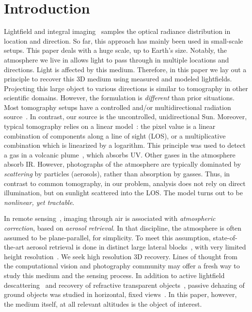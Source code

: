 \documentclass[10pt,twocolumn,letterpaper]{article}
\begin{document}
\section{Introduction}

Lightfield and integral imaging~\cite{bishop,horstmeyer,levoy,kim}  samples the optical radiance distribution in location and direction. So far, this approach has mainly been used in small-scale setups. This paper deals with a huge scale, up to Earth's size.
Notably, the atmosphere we live in allows light to pass through in multiple locations and directions. Light is affected by this medium. Therefore, in this paper we lay out a principle to recover this 3D medium using measured and modeled lightfields. Projecting this large object to various directions is similar to tomography in other scientific domains. However, the formulation is {\em different} than prior situations. Most tomography setups have a controlled and/or multidirectional radiation source~\cite{gorbunov,messer}. In contrast, our source is the uncontrolled, unidirectional Sun. Moreover, typical tomography relies on a linear model~\cite{gregson}: the pixel value is a linear combination of components along a line of sight (LOS), or a multiplicative combination which is linearized by a logarithm. This principle was used to detect a gas in a volcanic plume~\cite{wright}, which absorbs UV. Other gases in the atmosphere absorb IR. However, photographs of the atmosphere are typically dominated by {\em scattering} by particles (aerosols), rather than absorption by gasses. Thus, in contrast to common tomography, in our problem, analysis does not rely on direct illumination, but on sunlight scattered into the LOS. The model turns out to be {\em nonlinear, yet tractable}.

In remote sensing~\cite{diner,kokhan}, imaging through air is associated with {\em atmospheric correction}, based on {\em aerosol retrieval}. In that discipline, the atmosphere is often assumed to be plane-parallel, for simplicity. To meet this assumption, state-of-the-art aerosol retrieval is done in distinct large lateral blocks~\cite{matronchik}, with very limited height resolution~\cite{kalashnikova}. We seek high resolution 3D recovery. Lines of thought from the computational vision and photography community may offer a fresh way to study this medium and the sensing process. In addition to active lightfield descattering~\cite{fuchs,levoy,kim} and recovery of refractive transparent objects~\cite{ihrke}, passive dehazing of ground objects was studied in horizontal, fixed views~\cite{fattal,he,kopf,kratz,narasimhan2,oakley,Hschechner2,tan}. In this paper, however, the medium itself, at all relevant altitudes is the object of interest.
\end{document}
